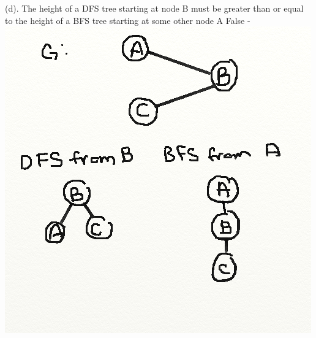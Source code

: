 \documentclass{article}
\begin{document}
(d). The height of a DFS tree starting at node B must be greater than or equal to the height of a BFS tree
starting at some other node A\newline{}
False - \newline{}
\includegraphics[width=\textwidth]{problemcd.png}
\end{document}
